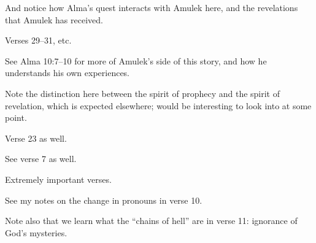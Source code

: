 \begin{compactdesc}
			\item[{\hyperref[ALMA-8-20]{Alma 8:20}}] \phantom{.}	
				\begin{compactitem}
					\item And notice how Alma's quest interacts with Amulek here, and the revelations that Amulek has received.
					\item Verses 29--31, etc.
					\item See Alma 10:7--10 for more of Amulek's side of this story, and how he understands his own experiences.
				\end{compactitem}
			\item[{\hyperref[ALMA-8-24]{Alma 8:24}}]
			\item[{\hyperref[ALMA-8-31]{Alma 8:31--32}}] 
			\item[{\hyperref[ALMA-9-19]{Alma 9:19--21}}] \phantom{.}
				\begin{compactitem}
					\item Note the distinction here between the spirit of prophecy and the spirit of revelation, which is expected elsewhere; would be interesting to look into at some point.
					\item Verse 23 as well.
				\end{compactitem} 
			\item[{\hyperref[ALMA-10-5]{Alma 10:5--6}}]
			\item[{\hyperref[ALMA-10-12]{Alma 10:12}}]
			\item[{\hyperref[ALMA-10-17]{Alma 10:17}}]
			\item[{\hyperref[ALMA-10-25]{Alma 10:25}}]
			\item[{\hyperref[ALMA-11-22]{Alma 11:22}}]
			\item[{\hyperref[ALMA-12-3]{Alma 12:3}}] \phantom{.}
				\begin{compactitem}
					\item See verse 7 as well.
				\end{compactitem}
			\item[{\hyperref[ALMA-12-8]{Alma 12:8--11}}] \phantom{.}
				\begin{compactitem}
					\item Extremely important verses.
					\item See my notes on the change in pronouns in verse 10.
					\item Note also that we learn what the ``chains of hell'' are in verse 11: ignorance of God's mysteries.
				\end{compactitem}
			\item[{\hyperref[ALMA-12-28]{Alma 12:28}}] \phantom{.}

\end{compactdesc}
